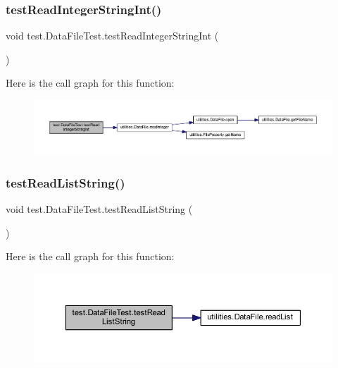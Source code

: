 \subsubsection{\texorpdfstring{test\+Read\+Integer\+String\+Int()}{testReadIntegerStringInt()}}
{\footnotesize\ttfamily void test.\+Data\+File\+Test.\+test\+Read\+Integer\+String\+Int (\begin{DoxyParamCaption}{ }\end{DoxyParamCaption})}

Here is the call graph for this function\+:\nopagebreak
\begin{figure}[H]
\begin{center}
\leavevmode
\includegraphics[width=350pt]{classtest_1_1_data_file_test_aa614885277711640980410c5faa5b609_cgraph}
\end{center}
\end{figure}
\mbox{\label{classtest_1_1_data_file_test_ad4b0d957eebabf51055d0e7c8be254e7}} 
\subsubsection{\texorpdfstring{test\+Read\+List\+String()}{testReadListString()}}
{\footnotesize\ttfamily void test.\+Data\+File\+Test.\+test\+Read\+List\+String (\begin{DoxyParamCaption}{ }\end{DoxyParamCaption})}

Here is the call graph for this function\+:\nopagebreak
\begin{figure}[H]
\begin{center}
\leavevmode
\includegraphics[width=350pt]{classtest_1_1_data_file_test_ad4b0d957eebabf51055d0e7c8be254e7_cgraph}
\end{center}
\end{figure}
\mbox{\label{classtest_1_1_data_file_test_ab61a29d98e2d1b08099008e0a5c53b63}} 

